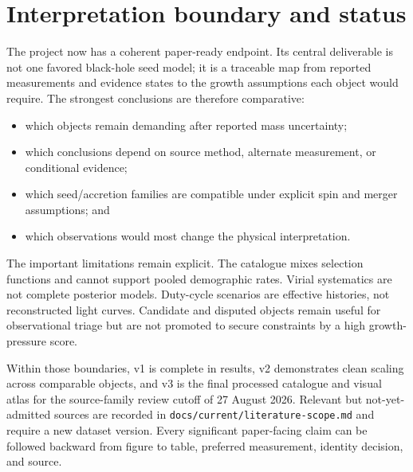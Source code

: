 \documentclass[10.5pt]{article}
\newcommand{\repo}[1]{{\footnotesize\texttt{#1}}}
\begin{document}
\section{Interpretation boundary and status}

The project now has a coherent paper-ready endpoint. Its central deliverable is
not one favored black-hole seed model; it is a traceable map from reported
measurements and evidence states to the growth assumptions each object would
require. The strongest conclusions are therefore comparative:

\begin{itemize}
  \item which objects remain demanding after reported mass uncertainty;
  \item which conclusions depend on source method, alternate measurement, or
  conditional evidence;
  \item which seed/accretion families are compatible under explicit spin and
  merger assumptions; and
  \item which observations would most change the physical interpretation.
\end{itemize}

The important limitations remain explicit. The catalogue mixes selection
functions and cannot support pooled demographic rates. Virial systematics are
not complete posterior models. Duty-cycle scenarios are effective histories,
not reconstructed light curves. Candidate and disputed objects remain useful
for observational triage but are not promoted to secure constraints by a high
growth-pressure score.

Within those boundaries, v1 is complete in results, v2 demonstrates clean
scaling across comparable objects, and v3 is the final processed catalogue and
visual atlas for the source-family review cutoff of 27 August 2026. Relevant
but not-yet-admitted sources are recorded in
\repo{docs/current/literature-scope.md} and require a new dataset version.
Every significant paper-facing claim can be followed backward
from figure to table, preferred measurement, identity decision, and source.
\end{document}
